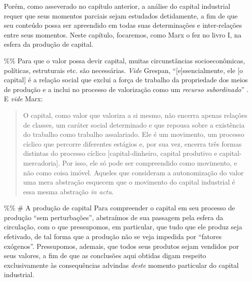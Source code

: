\documentclass[12pt]{article}
\numberwithin{equation}{section}
\theoremstyle{plain}
\theoremstyle{definition}
\theoremstyle{remark}
\begin{document}
Porém, como asseverado no capítulo anterior, a análise do capital industrial requer que seus momentos parciais sejam estudados detidamente, a fim de que seu conteúdo possa ser apreendido em todas suas determinações e inter-relações entre seus momentos. Neste capítulo, focaremos, como Marx o fez no livro I, na esfera da produção de capital.

\%\% Para que o valor possa devir capital, muitas circunstâncias socioeconômicas, políticas, estruturais etc. são necessárias. \emph{Vide} Grespan, ``{[}e{]}ssencialmente, ele {[}o capital{]} é a relação social que exclui a força de trabalho da propriedade dos meios de produção e a inclui no processo de valorização como um \emph{recurso subordinado}'' \parencite[p. 49, grifo meu]{Grespan2021}. E \emph{vide} Marx:

\begin{quote}
O capital, como valor que valoriza a si mesmo, não encerra apenas relações de classes, um caráter social determinado e que repousa sobre a existência do trabalho como trabalho assalariado. Ele é um movimento, um processo cíclico que percorre diferentes estágios e, por sua vez, encerra três formas distintas do processo cíclico {[}capital-dinheiro, capital produtivo e capital-mercadoria{]}. Por isso, ele só pode ser compreendido como movimento, e não como coisa imóvel. Aqueles que consideram a autonomização do valor uma mera abstração esquecem que o movimento do capital industrial é essa mesma abstração \emph{in actu}. \parencite[p. 184]{Marx2014}
\end{quote}

\%\% \# A produção de capital Para compreender o capital em seu processo de produção ``sem perturbações'', abstraímos de sua passagem pela esfera da circulação, com o que pressupomos, em particular, que tudo que ele produz seja efetivado, de tal forma que a produção não se veja impedida por ``fatores exógenos''. Pressupomos, ademais, que todos seus produtos sejam vendidos por seus valores, a fim de que as conclusões aqui obtidas digam respeito exclusivamente às consequências advindas \emph{deste} momento particular do capital industrial.
\end{document}

